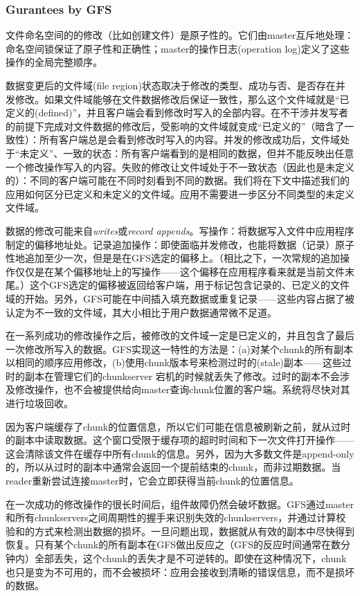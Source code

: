 \documentclass{article}
\begin{document}
\subsubsection{Gurantees by GFS}
文件命名空间的的修改（比如创建文件）是原子性的。它们由master互斥地处理：命名空间锁保证了原子性和正确性；master的操作日志(operation log)定义了这些操作的全局完整顺序。\par
数据变更后的文件域(file region)状态取决于修改的类型、成功与否、是否存在并发修改。如果文件域能够在文件数据修改后保证一致性，那么这个文件域就是“已定义的(defined)”，并且客户端会看到修改时写入的全部内容。在不干涉并发写者的前提下完成对文件数据的修改后，受影响的文件域就变成“已定义的”（暗含了一致性）：所有客户端总是会看到修改时写入的内容。并发的修改成功后，文件域处于“未定义”、一致的状态：所有客户端看到的是相同的数据，但并不能反映出任意一个修改操作写入的内容。失败的修改让文件域处于不一致状态（因此也是未定义的）：不同的客户端可能在不同时刻看到不同的数据。我们将在下文中描述我们的应用如何区分已定义和未定义的文件域。应用不需要进一步区分不同类型的未定义文件域。\par
数据的修改可能来自\emph{writes}或\emph{record appends}。写操作：将数据写入文件中应用程序制定的偏移地址处。记录追加操作：即使面临并发修改，也能将数据（记录）原子性地追加至少一次，但是是在GFS选定的偏移上。（相比之下，一次常规的追加操作仅仅是在某个偏移地址上的写操作——这个偏移在应用程序看来就是当前文件末尾。）这个GFS选定的偏移被返回给客户端，用于标记包含记录的、已定义的文件域的开始。另外，GFS可能在中间插入填充数据或重复记录——这些内容占据了被认定为不一致的文件域，其大小相比于用户数据通常微不足道。\par
在一系列成功的修改操作之后，被修改的文件域一定是已定义的，并且包含了最后一次修改所写入的数据。GFS实现这一特性的方法是：(a)对某个chunk的所有副本以相同的顺序应用修改，(b)使用chunk版本号来检测过时的(stale)副本——这些过时的副本在管理它们的chunkserver 宕机的时候就丢失了修改。过时的副本不会涉及修改操作，也不会被提供给向master查询chunk位置的客户端。系统将尽快对其进行垃圾回收。\par
因为客户端缓存了chunk的位置信息，所以它们可能在信息被刷新之前，就从过时的副本中读取数据。这个窗口受限于缓存项的超时时间和下一次文件打开操作——这会清除该文件在缓存中所有chunk的信息。另外，因为大多数文件是append-only的，所以从过时的副本中通常会返回一个提前结束的chunk，而非过期数据。当reader重新尝试连接master时，它会立即获得当前chunk的位置信息。\par
在一次成功的修改操作的很长时间后，组件故障仍然会破坏数据。GFS通过master和所有chunkservers之间周期性的握手来识别失效的chunkservers，并通过计算校验和的方式来检测出数据的损坏。一旦问题出现，数据就从有效的副本中尽快得到恢复。只有某个chunk的所有副本在GFS做出反应之（GFS的反应时间通常在数分钟内）全部丢失，这个chunk的丢失才是不可逆转的。即使在这种情况下，chunk也只是变为不可用的，而不会被损坏：应用会接收到清晰的错误信息，而不是损坏的数据。
\end{document}

